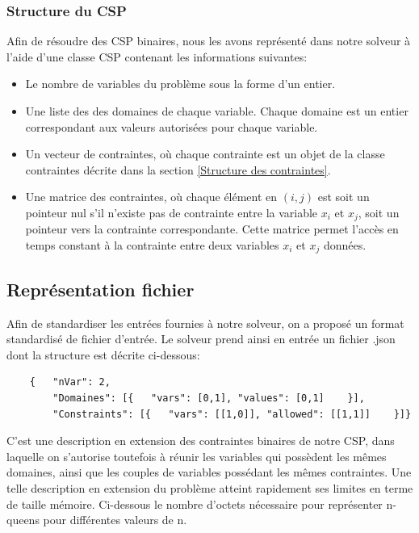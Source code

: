 \documentclass[14pt]{article}
\begin{document}
\subsubsection{Structure du CSP}

Afin de résoudre des CSP binaires, nous les avons représenté dans notre solveur à l'aide d'une classe CSP contenant les informations suivantes:

\begin{itemize}
	\item Le nombre de variables du problème sous la forme d'un entier.
	\item Une liste des des domaines de chaque variable. Chaque domaine est un entier correspondant aux valeurs autorisées pour chaque variable.
	\item Un vecteur de contraintes, où chaque contrainte est un objet de la classe contraintes décrite dans la section \ref{Structure des contraintes}.
	\item Une matrice des contraintes, où chaque élément en $(i,j)$ est soit un pointeur nul s'il n'existe pas de contrainte entre la variable $x_i$ et $x_j$, soit un pointeur vers la contrainte correspondante. Cette matrice permet l'accès en temps constant à la contrainte entre deux variables $x_i$ et $x_j$ données.
\end{itemize}

\subsection{Représentation fichier}

Afin de standardiser les entrées fournies à notre solveur, on a proposé un format standardisé de fichier d'entrée. Le solveur prend ainsi en entrée un fichier .json dont la structure est décrite ci-dessous:

\begin{verbatim}
	{   "nVar": 2,
	    "Domaines": [{   "vars": [0,1], "values": [0,1]    }],
	    "Constraints": [{   "vars": [[1,0]], "allowed": [[1,1]]    }]}
\end{verbatim}

C'est une description en extension des contraintes binaires de notre CSP, dans laquelle on s'autorise toutefois à réunir les variables qui possèdent les mêmes domaines, ainsi que les couples de variables possédant les mêmes contraintes. Une telle description en extension du problème atteint rapidement ses limites en terme de taille mémoire. Ci-dessous le nombre d'octets nécessaire pour représenter n-queens pour différentes valeurs de n.
\end{document}
